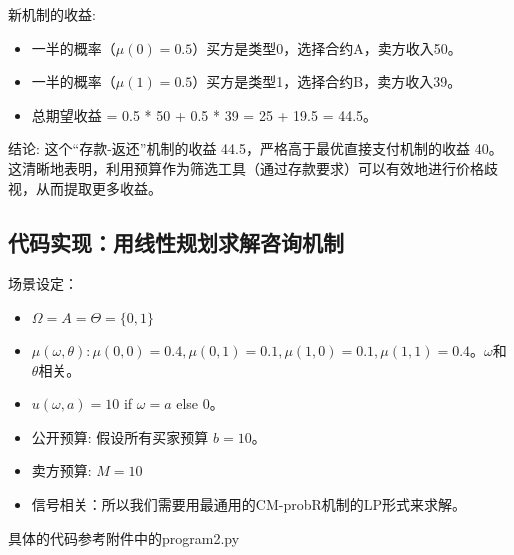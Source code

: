 新机制的收益:
\begin{itemize}
    \item 一半的概率（$\mu(0)=0.5$）买方是类型0，选择合约A，卖方收入50。
    \item 一半的概率（$\mu(1)=0.5$）买方是类型1，选择合约B，卖方收入39。
    \item 总期望收益 = 0.5 * 50 + 0.5 * 39 = 25 + 19.5 = 44.5。
\end{itemize}

结论: 这个“存款-返还”机制的收益 44.5，严格高于最优直接支付机制的收益 40。这清晰地表明，利用预算作为筛选工具（通过存款要求）可以有效地进行价格歧视，从而提取更多收益。

\subsection{代码实现：用线性规划求解咨询机制}

场景设定：
\begin{itemize}
    \item $\Omega=A=\Theta=\{0,1\}$
    \item $\mu(\omega,\theta):\mu(0,0)=0.4,\mu(0,1)=0.1,\mu(1,0)=0.1,\mu(1,1)=0.4$。$\omega$和$\theta$相关。
    \item $u(\omega,a)=10$ if $\omega=a$ else 0。
    \item 公开预算: 假设所有买家预算 $b = 10$。
    \item 卖方预算: $M = 10$
    \item 信号相关：所以我们需要用最通用的CM-probR机制的LP形式来求解。
\end{itemize}

具体的代码参考附件中的program2.py

